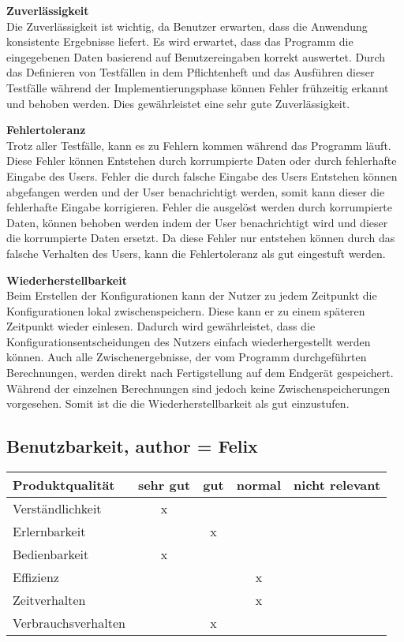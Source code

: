 \documentclass[parskip=full]{scrartcl} %
\begin{document}
\textbf{Zuverlässigkeit\\}
Die Zuverlässigkeit ist wichtig, da Benutzer erwarten, dass die Anwendung konsistente Ergebnisse liefert.
Es wird erwartet, dass das Programm die eingegebenen Daten basierend auf Benutzereingaben korrekt auswertet.
Durch das Definieren von Testfällen in dem Pflichtenheft und das Ausführen dieser Testfälle während der Implementierungsphase können Fehler frühzeitig erkannt und behoben werden.
Dies gewährleistet eine sehr gute Zuverlässigkeit.

\textbf{Fehlertoleranz\\}
Trotz aller Testfälle, kann es zu Fehlern kommen während das Programm läuft. Diese Fehler können Entstehen durch korrumpierte Daten oder durch fehlerhafte Eingabe des Users.
Fehler die durch falsche Eingabe des Users Entstehen können abgefangen werden und der User benachrichtigt werden, somit kann dieser die fehlerhafte Eingabe korrigieren.
Fehler die ausgelöst werden durch korrumpierte Daten, können behoben werden indem der User benachrichtigt wird und dieser die korrumpierte Daten ersetzt.
Da diese Fehler nur entstehen können durch das falsche Verhalten des Users, kann 
die Fehlertoleranz als gut eingestuft werden.

\textbf{Wiederherstellbarkeit\\}
Beim Erstellen der Konfigurationen kann der Nutzer zu jedem Zeitpunkt die Konfigurationen lokal zwischenspeichern. Diese kann er zu einem späteren Zeitpunkt wieder einlesen. Dadurch wird gewährleistet, dass die Konfigurationsentscheidungen des Nutzers einfach wiederhergestellt werden können.
Auch alle Zwischenergebnisse, der vom Programm durchgeführten Berechnungen, werden direkt nach Fertigstellung auf dem Endgerät gespeichert. Während der einzelnen Berechnungen sind jedoch keine Zwischenspeicherungen vorgesehen.
Somit ist die die Wiederherstellbarkeit als gut einzustufen.


\newpage 


\subsection{Benutzbarkeit, author = Felix}

    \begin{tabular}{|l| c| c| c| c|}
    \hline
        Produktqualität & sehr gut & gut & normal & nicht relevant \\
    \hline
        Verständlichkeit & x & & &\\
    \hline
        Erlernbarkeit & & x & &\\
    \hline
        Bedienbarkeit & x & & &\\
    \hline
        Effizienz & & & x &\\
    \hline
        Zeitverhalten & & & x &\\
    \hline
        Verbrauchsverhalten & & x & &\\
    \hline
    \end{tabular}
\end{document}
